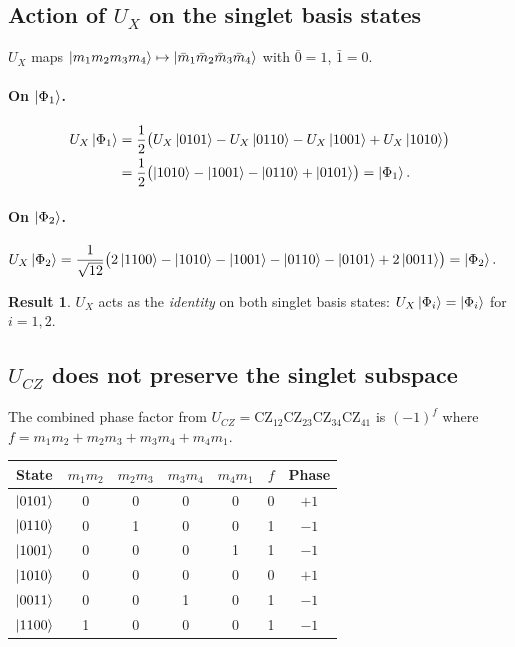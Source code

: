 \documentclass[11pt,a4paper]{article}
\newcommand{\CZ}{\mathrm{CZ}}
\theoremstyle{definition}
\newtheorem{result}{Result}
\begin{document}
\subsection{Action of $U_X$ on the singlet basis states}

$U_X$ maps $\ket{m_1 m_2 m_3 m_4}\mapsto\ket{\bar m_1 \bar m_2 \bar m_3 \bar m_4}$
with $\bar 0 = 1$, $\bar 1 = 0$.

\paragraph{On $\ket{\Phi_1}$.}
\begin{align*}
  U_X\ket{\Phi_1}
  &= \frac{1}{2}\bigl(
     U_X\ket{0101}-U_X\ket{0110}-U_X\ket{1001}+U_X\ket{1010}
     \bigr)\\
  &= \frac{1}{2}\bigl(
     \ket{1010}-\ket{1001}-\ket{0110}+\ket{0101}
     \bigr)
  = \ket{\Phi_1}.
\end{align*}

\paragraph{On $\ket{\Phi_2}$.}
\begin{align*}
  U_X\ket{\Phi_2}
  &= \frac{1}{\sqrt{12}}\bigl(
     2\ket{1100}-\ket{1010}-\ket{1001}
     -\ket{0110}-\ket{0101}+2\ket{0011}
     \bigr)
  = \ket{\Phi_2}.
\end{align*}

\begin{result}\label{res:UX}
  $U_X$ acts as the \emph{identity} on both singlet basis states:
  $U_X\ket{\Phi_i} = \ket{\Phi_i}$ for $i=1,2$.
\end{result}

\subsection{$U_{CZ}$ does not preserve the singlet subspace}
\label{sub:UCZ}

The combined phase factor from $U_{CZ} = \CZ_{12}\CZ_{23}\CZ_{34}\CZ_{41}$ is
$(-1)^{f}$ where $f = m_1 m_2 + m_2 m_3 + m_3 m_4 + m_4 m_1$.

\begin{center}
\begin{tabular}{c|cccc|c|c}
  State & $m_1m_2$ & $m_2m_3$ & $m_3m_4$ & $m_4m_1$ & $f$ & Phase \\
  \hline
  $\ket{0101}$ & 0 & 0 & 0 & 0 & 0 & $+1$ \\
  $\ket{0110}$ & 0 & 1 & 0 & 0 & 1 & $-1$ \\
  $\ket{1001}$ & 0 & 0 & 0 & 1 & 1 & $-1$ \\
  $\ket{1010}$ & 0 & 0 & 0 & 0 & 0 & $+1$ \\
  $\ket{0011}$ & 0 & 0 & 1 & 0 & 1 & $-1$ \\
  $\ket{1100}$ & 1 & 0 & 0 & 0 & 1 & $-1$ \\
\end{tabular}
\end{center}
\end{document}
